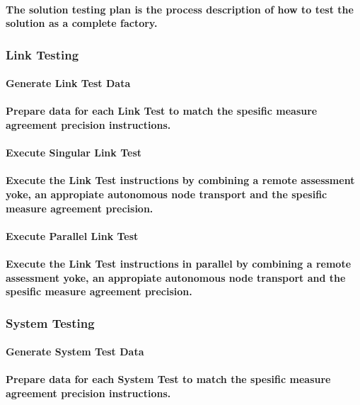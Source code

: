 \documentclass{acm_proc_article-sp}
\begin{document}
\paragraph{The solution testing plan is the process description of how to test the solution as a complete factory.}
\subsubsection{Link Testing}
\paragraph{Generate Link Test Data}
\paragraph{Prepare data for each Link Test to match the spesific measure agreement precision instructions.}
\paragraph{Execute Singular Link Test}
\paragraph{Execute the Link Test instructions by combining a remote assessment yoke, an appropiate autonomous node transport and the spesific measure agreement precision.}
\paragraph{Execute Parallel Link Test}
\paragraph{Execute the Link Test instructions in parallel by combining a remote assessment yoke, an appropiate autonomous node transport and the spesific measure agreement precision.}
\subsubsection{System Testing}
\paragraph{Generate System Test Data}
\paragraph{Prepare data for each System Test to match the spesific measure agreement precision instructions.}
\end{document}
